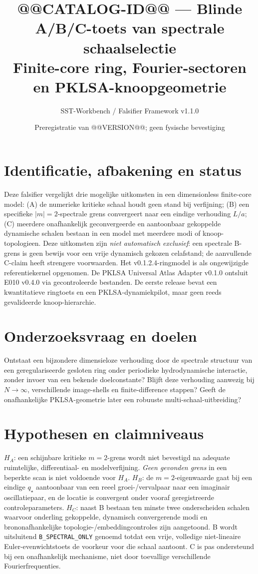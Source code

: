 \documentclass[11pt,a4paper]{article}
\title{@@CATALOG-ID@@ --- Blinde A/B/C-toets van spectrale schaalselectie\\
\large Finite-core ring, Fourier-sectoren en PKLSA-knoopgeometrie}
\author{SST-Workbench / Falsifier Framework v1.1.0}
\date{Preregistratie van @@VERSION@@; geen fysische bevestiging}
\begin{document}
\maketitle
\section{Identificatie, afbakening en status}
Deze falsifier vergelijkt drie mogelijke uitkomsten in een dimensionless finite-core model:
(A) de numerieke kritieke schaal houdt geen stand bij verfijning;
(B) een specifieke $|m|=2$-spectrale grens convergeert naar een eindige verhouding $L/a$;
(C) meerdere onafhankelijk geconvergeerde en aantoonbaar gekoppelde dynamische schalen bestaan in een model met meerdere modi of knoop-topologieen.
Deze uitkomsten zijn \emph{niet automatisch exclusief}: een spectrale B-grens is geen bewijs voor een vrije dynamisch gekozen celafstand; de aanvullende C-claim heeft strengere voorwaarden.
Het v0.1.2.4-ringmodel is als ongewijzigde referentiekernel opgenomen. De PKLSA Universal Atlas Adapter v0.1.0 ontsluit E010 v0.4.0 via gecontroleerde bestanden. De eerste release bevat een kwantitatieve ringtoets en een PKLSA-dynamiekpilot, maar geen reeds gevalideerde knoop-hierarchie.

\section{Onderzoeksvraag en doelen}
Ontstaat een bijzondere dimensieloze verhouding door de spectrale structuur van een geregulariseerde gesloten ring onder periodieke hydrodynamische interactie, zonder invoer van een bekende doelconstante? Blijft deze verhouding aanwezig bij $N\rightarrow\infty$, verschillende image-shells en finite-difference stappen? Geeft de onafhankelijke PKLSA-geometrie later een robuuste multi-schaal-uitbreiding?

\section{Hypothesen en claimniveaus}
$H_A$: een schijnbare kritieke $m=2$-grens wordt niet bevestigd na adequate ruimtelijke, differentiaal- en modelverfijning. \emph{Geen gevonden grens} in een beperkte scan is niet voldoende voor $H_A$.
$H_B$: de $m=2$-eigenwaarde gaat bij een eindige $q_\star$ aantoonbaar van een reeel groei-/vervalpaar naar een imaginair oscillatiepaar, en de locatie is convergent onder vooraf geregistreerde controleparameters.
$H_C$: naast B bestaan ten minste twee onderscheiden schalen waarvoor onderling gekoppelde, dynamisch convergerende modi en brononafhankelijke topologie-/embeddingcontroles zijn aangetoond.
B wordt uitsluitend \texttt{B\_SPECTRAL\_ONLY} genoemd totdat een vrije, volledige niet-lineaire Euler-evenwichtstoets de voorkeur voor die schaal aantoont. C is pas ondersteund bij een onafhankelijk mechanisme, niet door toevallige verschillende Fourierfrequenties.
\end{document}
